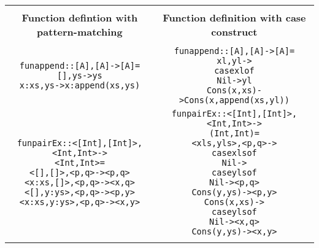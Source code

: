 \documentclass[11pt]{article}
\begin{document}
\begin{table}[h!]
\begin{center}
\begin{tabular}{|c|c|} \hline
{}& {}\\
{\bf Function defintion with pattern-matching} & {\bf Function definition with case construct} \\ 
{}& {}\\
\hline
\begin{minipage}{2.6in}
\begin{alltt}


fun append :: [A],[A] -> [A] = 
  [],   ys   -> ys 
  x:xs, ys   -> x:append (xs,ys) 


\end{alltt}
\end {minipage} &
\begin{minipage}{3.2in}
\begin{alltt}



fun append :: [A],[A] -> [A] = 
  xl,yl -> 
    case xl of
      Nil -> yl
      Cons(x,xs) -> Cons(x,append(xs,yl))


\end{alltt} 
\end {minipage}\\
\hline 
\begin{minipage}{2.6in}
\begin{alltt}


fun pairEx::<[Int],[Int]>,<Int,Int> -> 
            <Int,Int> = 
  <[]  ,[]>,<p,q>   -> <p,q> 
  <x:xs,[]>,<p,q>   -> <x,q>
  <[],y:ys>,<p,q>   -> <p,y>
  <x:xs,y:ys>,<p,q> -> <x,y>


\end{alltt}
\end {minipage} &
\begin{minipage}{3.2in}
\begin{alltt}



fun pairEx::<[Int],[Int]>,<Int,Int> -> 
            (Int,Int) =  
  <xls,yls>,<p,q> ->
     case xls of
       Nil -> 
         case yls of
           Nil        -> <p,q>
           Cons(y,ys) -> <p,y>
       Cons(x,xs) ->    
         case yls of
           Nil        -> <x,q>
           Cons(y,ys) -> <x,y>  


\end{alltt} 
\end {minipage}\\ 
\hline 
\begin{minipage}{2.6in}
\begin{alltt}



\end{alltt}
\end{minipage}
\end{tabular}
\end{center}
\end{table}
\end{document}
